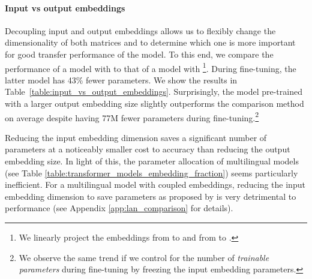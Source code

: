 \documentclass{article} \usepackage{iclr2021_conference,times}
\newcommand{\xtreme}{\textsc{xtreme}\xspace}
\begin{document}
\begin{table*}[t]
\caption{Effect of decoupling the input and output embedding matrices on performance on multiple tasks in \xtreme. PT: Pre-training. FT: Fine-tuning.}
\label{table:coupled_vs_decoupled}
\begin{center}
\end{center}
\end{table*}



\paragraph{Input vs output embeddings} Decoupling input and output embeddings allows us to flexibly change the dimensionality of both matrices and to determine which one is more important for good transfer performance of the model. To this end, we compare the performance of a model with  to that of a model with \footnote{We linearly project the embeddings from  to  and from  to .}. During fine-tuning, the latter model has 43\% fewer parameters. We show the results in Table~\ref{table:input_vs_output_embeddings}. Surprisingly, the model pre-trained with a larger output embedding size slightly outperforms the comparison method on average despite having 77M fewer parameters during fine-tuning.\footnote{We observe the same trend if we control for the number of \emph{trainable parameters} during fine-tuning by freezing the input embedding parameters.}





Reducing the input embedding dimension saves a significant number of parameters at a noticeably smaller cost to accuracy than reducing the output embedding size. In light of this, the parameter allocation of multilingual models (see Table \ref{table:transformer_models_embedding_fraction}) seems particularly inefficient.
For a multilingual model with coupled embeddings, reducing the input embedding dimension to save parameters as proposed by \citet{Lan2020} is very detrimental to performance (see Appendix \ref{app:lan_comparison} for details). 
\end{document}
